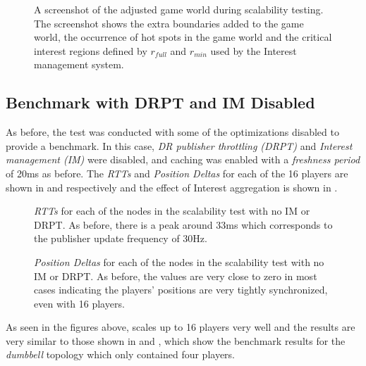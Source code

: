 \begin{figure}[H]
    \centering
    \caption{A screenshot of the adjusted game world during scalability testing. The screenshot shows the extra boundaries added to the game world, the occurrence of hot spots in the game world and the critical interest regions defined by $r_{full}$ and $r_{min}$ used by the Interest management system.}
    \label{fig:eval:hotspotting}
\end{figure}


\subsection{Benchmark with DRPT and IM Disabled}
As before, the test was conducted with some of the optimizations disabled to provide a benchmark. In this case, \textit{DR publisher throttling (DRPT)} and \textit{Interest management (IM)} were disabled, and caching was enabled with a \textit{freshness period} of 20ms as before. The \textit{RTTs} and \textit{Position Deltas} for each of the 16 players are shown in  and  respectively and the effect of Interest aggregation is shown in .

\begin{figure}[H]
    \centering
    \caption{\textit{RTTs} for each of the nodes in the scalability test with no IM or DRPT. As before, there is a peak around 33ms which corresponds to the publisher update frequency of 30Hz.}
    \label{fig:eval:no-im-no-dr:agg-packet-times}
\end{figure}

\begin{figure}[H]
    \centering
    \caption{\textit{Position Deltas} for each of the nodes in the scalability test with no IM or DRPT. As before, the values are very close to zero in most cases indicating the players' positions are very tightly synchronized, even with 16 players.}
    \label{fig:eval:no-im-no-dr:agg-pos-deltas}
\end{figure}

As seen in the figures above, \game{} scales up to 16 players very well and the results are very similar to those shown in  and , which show the benchmark results for the \textit{dumbbell} topology which only contained four players. 

